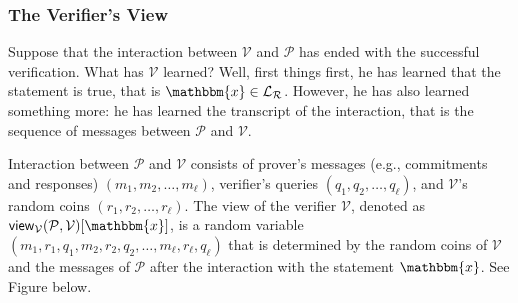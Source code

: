 \documentclass[../lecture-notes-148x210.tex]{subfiles}
\begin{document}
\subsubsection{The Verifier's View}
Suppose that the interaction between $\mathcal{V}$ and $\mathcal{P}$ has ended
with the successful verification. What has $\mathcal{V}$ learned? Well, first
things first, he has learned that the statement is true, that is $\mathbbm{x}
\in \mathcal{L}_{\mathcal{R}}$. However, he has also learned something more: he
has learned the transcript of the interaction, that is the sequence of messages
between $\mathcal{P}$ and $\mathcal{V}$.

\vspace{-1mm}

\begin{definition}
    Interaction between $\mathcal{P}$ and $\mathcal{V}$ consists of prover's
    messages (e.g., commitments and responses) $(m_1,m_2,\dots,m_{\ell})$,
    verifier's queries $(q_1,q_2,\dots,q_{\ell})$, and $\mathcal{V}$'s random
    coins $(r_1,r_2,\dots,r_{\ell})$. The view of the verifier $\mathcal{V}$,
    denoted as
    $\mathsf{view}_{\mathcal{V}}(\mathcal{P},\mathcal{V})[\mathbbm{x}]$, is a
    random variable $(m_1,r_1,q_1,m_2,r_2,q_2,\dots,m_{\ell},r_{\ell},q_{\ell})$
    that is determined by the random coins of $\mathcal{V}$ and the messages of
    $\mathcal{P}$ after the interaction with the statement $\mathbbm{x}$. See
    Figure below.
\end{definition}

\vspace{-3mm}
\end{document}
